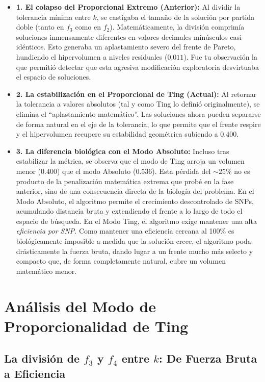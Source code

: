 \documentclass[11pt,a4paper]{article}
\begin{document}
\begin{itemize}
    \item \textbf{1. El colapso del Proporcional Extremo (Anterior):} Al dividir la tolerancia mínima entre $k$, se castigaba el tamaño de la solución por partida doble (tanto en $f_3$ como en $f_2$). Matemáticamente, la división comprimía soluciones inmensamente diferentes en valores decimales minúsculos casi idénticos. Esto generaba un aplastamiento severo del frente de Pareto, hundiendo el hipervolumen a niveles residuales ($0.011$). Fue tu observación la que permitió detectar que esta agresiva modificación exploratoria desvirtuaba el espacio de soluciones.

    \item \textbf{2. La estabilización en el Proporcional de Ting (Actual):} Al retornar la tolerancia a valores absolutos (tal y como Ting lo definió originalmente), se elimina el ``aplastamiento matemático''. Las soluciones ahora pueden separarse de forma natural en el eje de la tolerancia, lo que permite que el frente respire y el hipervolumen recupere su estabilidad geométrica subiendo a $0.400$.

    \item \textbf{3. La diferencia biológica con el Modo Absoluto:} Incluso tras estabilizar la métrica, se observa que el modo de Ting arroja un volumen menor ($0.400$) que el modo Absoluto ($0.536$). Esta pérdida del $\sim 25\%$ no es producto de la penalización matemática extrema que probé en la fase anterior, sino de una consecuencia directa de la biología del problema. En el Modo Absoluto, el algoritmo permite el crecimiento descontrolado de SNPs, acumulando distancia bruta y extendiendo el frente a lo largo de todo el espacio de búsqueda. En el Modo Ting, el algoritmo exige mantener una alta \textit{eficiencia por SNP}. Como mantener una eficiencia cercana al 100\% es biológicamente imposible a medida que la solución crece, el algoritmo poda drásticamente la fuerza bruta, dando lugar a un frente mucho más selecto y compacto que, de forma completamente natural, cubre un volumen matemático menor.
\end{itemize}

\section{Análisis del Modo de Proporcionalidad de Ting}

\subsection{La división de $f_3$ y $f_4$ entre $k$: De Fuerza Bruta a Eficiencia}
\end{document}
